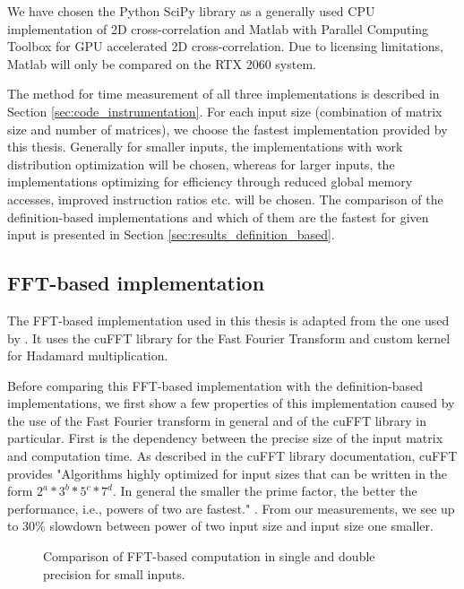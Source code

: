 We have chosen the Python SciPy  library as a generally used CPU implementation of 2D cross-correlation and Matlab with Parallel Computing Toolbox for GPU accelerated 2D cross-correlation. Due to licensing limitations, Matlab will only be compared on the RTX 2060 system.

The method for time measurement of all three implementations is described in Section \ref{sec:code_instrumentation}. For each input size (combination of matrix size and number of matrices), we choose the fastest implementation provided by this thesis. Generally for smaller inputs, the implementations with work distribution optimization will be chosen, whereas for larger inputs, the implementations optimizing for efficiency through reduced global memory accesses, improved instruction ratios etc. will be chosen. The comparison of the definition-based implementations and which of them are the fastest for given input is presented in Section \ref{sec:results_definition_based}. 

\subsection{FFT-based implementation}
\label{sec:results_fft_based}

The FFT-based implementation used in this thesis is adapted from the one used by \citet{misko}. It uses the cuFFT library for the Fast Fourier Transform and custom kernel for Hadamard multiplication. 

Before comparing this FFT-based implementation with the definition-based implementations, we first show a few properties of this implementation caused by the use of the Fast Fourier transform in general and of the cuFFT library in particular. First is the dependency between the precise size of the input matrix and computation time. As described in the cuFFT library documentation, cuFFT provides "Algorithms highly optimized for input sizes that can be written in the form $2^{a}*3^{b}*5^{c}*7^{d}$. In general the smaller the prime factor, the better the performance, i.e., powers of two are fastest." \citep{site:cufft}. From our measurements, we see up to 30\% 
slowdown between power of two input size and input size one smaller. 

\begin{figure}[ht]
	\centering
	\def\svgwidth{0.3\textwidth}
	
	\caption{Comparison of FFT-based computation in single and double precision for small inputs.}
	\label{fig:fft_double_faster_compute_time}
\end{figure}

